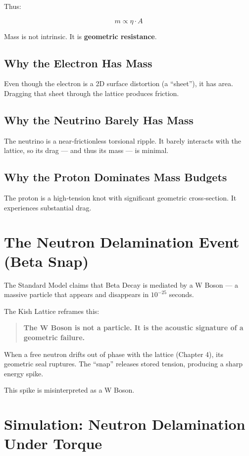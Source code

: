 \documentclass[11pt, letterpaper, openany]{book}
\begin{document}
Thus:



\[
m \propto \eta \cdot A
\]



Mass is not intrinsic.  
It is \textbf{geometric resistance}.

\subsection{Why the Electron Has Mass}

Even though the electron is a 2D surface distortion (a “sheet”), it has area.  
Dragging that sheet through the lattice produces friction.

\subsection{Why the Neutrino Barely Has Mass}

The neutrino is a near‑frictionless torsional ripple.  
It barely interacts with the lattice, so its drag — and thus its mass — is minimal.

\subsection{Why the Proton Dominates Mass Budgets}

The proton is a high‑tension knot with significant geometric cross‑section.  
It experiences substantial drag.

\section{The Neutron Delamination Event (Beta Snap)}

The Standard Model claims that Beta Decay is mediated by a W Boson — a massive particle that appears and disappears in $10^{-25}$ seconds.

The Kish Lattice reframes this:

\begin{quote}
\textbf{The W Boson is not a particle.  
It is the acoustic signature of a geometric failure.}
\end{quote}

When a free neutron drifts out of phase with the lattice (Chapter 4), its geometric seal ruptures.  
The “snap” releases stored tension, producing a sharp energy spike.

This spike is misinterpreted as a W Boson.

\section{Simulation: Neutron Delamination Under Torque}
\end{document}
